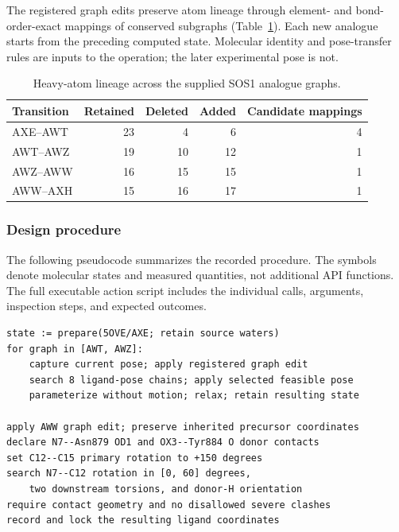 \documentclass[11pt]{article}
\begin{document}
\begin{small}
The registered graph edits preserve atom lineage through element- and bond-order-exact mappings of conserved subgraphs (Table~\ref{tab:appA_lineage}). Each new analogue starts from the preceding computed state. Molecular identity and pose-transfer rules are inputs to the operation; the later experimental pose is not.

\begin{table}[htbp]
\centering\small
\caption{Heavy-atom lineage across the supplied SOS1 analogue graphs.}
\label{tab:appA_lineage}
\begin{tabular}{@{}lrrrr@{}}
\toprule
\textbf{Transition} & \textbf{Retained} & \textbf{Deleted} & \textbf{Added} & \textbf{Candidate mappings}\\
\midrule
AXE--AWT & 23 & 4 & 6 & 4\\
AWT--AWZ & 19 & 10 & 12 & 1\\
AWZ--AWW & 16 & 15 & 15 & 1\\
AWW--AXH & 15 & 16 & 17 & 1\\
\bottomrule
\end{tabular}
\end{table}

\subsubsection{Design procedure}

The following pseudocode summarizes the recorded procedure. The symbols denote molecular states and measured quantities, not additional API functions. The full executable action script includes the individual calls, arguments, inspection steps, and expected outcomes.

\begin{lstlisting}[language={},float=htbp,caption={SOS1 design protocol (pseudocode).},label={lst:sos1protocol}]
state := prepare(5OVE/AXE; retain source waters)
for graph in [AWT, AWZ]:
    capture current pose; apply registered graph edit
    search 8 ligand-pose chains; apply selected feasible pose
    parameterize without motion; relax; retain resulting state

apply AWW graph edit; preserve inherited precursor coordinates
declare N7--Asn879 OD1 and OX3--Tyr884 O donor contacts
set C12--C15 primary rotation to +150 degrees
search N7--C12 rotation in [0, 60] degrees,
    two downstream torsions, and donor-H orientation
require contact geometry and no disallowed severe clashes
record and lock the resulting ligand coordinates


\end{lstlisting}
\end{small}
\end{document}
